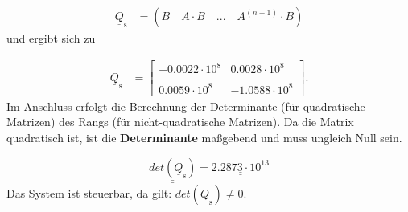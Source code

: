 \begin{align}
    \underline{Q}_{\mathrm{s}} &= \left(\underline{B} \quad \underline{A}\cdot\underline{B} \quad ... \quad \underline{A}^{(n-1)}\cdot\underline{B}\right)
    \label{eq:Gleichung17}
\end{align}
\newline
und ergibt sich zu

\begin{align}
    \underline{Q}_{\mathrm{s}} &=
    \begin{bmatrix}
        -0.0022\cdot 10^8 & 0.0028\cdot 10^8 \\\\
        0.0059\cdot 10^8 & -1.0588\cdot 10^8
    \end{bmatrix}.
    \label{eq:Gleichung18}
\end{align}
\newline
Im Anschluss erfolgt die Berechnung der Determinante (für quadratische Matrizen) \bzw des Rangs (für nicht-quadratische Matrizen). Da die Matrix quadratisch ist, ist die \textbf{Determinante} maßgebend und muss ungleich Null sein.

\begin{equation*}
    \boxed{\underline{\underline{det(\underline{Q}_{\mathrm{s}})}} = \underline{\underline{ 2.2873\cdot 10^{13}}}}
\end{equation*}
\newline
Das System ist steuerbar, da gilt: $det(\underline{Q}_{\mathrm{s}}) \neq 0$.